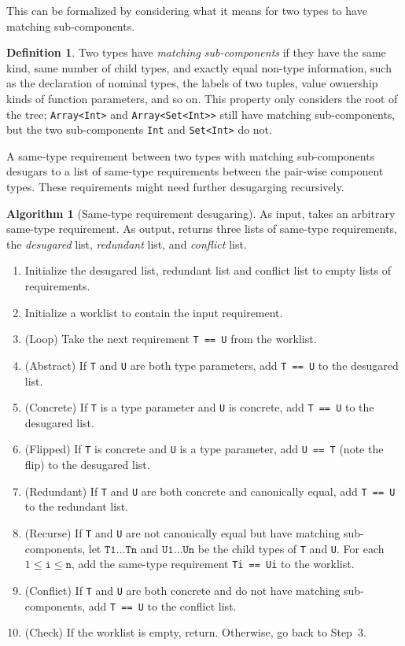 \documentclass[a4paper,headsepline,bibliography=totoc,toc=flat,fleqn,twoside=semi]{scrbook}
\theoremstyle{definition}
\newtheorem{definition}{Definition}[chapter]
\theoremstyle{definition}
\theoremstyle{definition}
\newtheorem{algorithm}{Algorithm}[chapter]
\begin{document}
This can be formalized by considering what it means for two types to have matching sub-components.
\begin{definition}
Two types have \emph{matching sub-components} if they have the same kind, same number of child types, and exactly equal non-type information, such as the declaration of nominal types, the labels of two tuples, value ownership kinds of function parameters, and so on. This property only considers the root of the tree; \texttt{Array<Int>} and \texttt{Array<Set<Int>>} still have matching sub-components, but the two sub-components \texttt{Int} and \texttt{Set<Int>} do not.
\end{definition}
A same-type requirement between two types with matching sub-components desugars to a list of same-type requirements between the pair-wise component types. These requirements might need further desugarging recursively.
\begin{algorithm}[Same-type requirement desugaring] As input, takes an arbitrary same-type requirement. As output, returns three lists of same-type requirements, the \emph{desugared} list, \emph{redundant} list, and \emph{conflict} list.
\begin{enumerate}
\item Initialize the desugared list, redundant list and conflict list to empty lists of requirements.
\item Initialize a worklist to contain the input requirement.
\item (Loop) Take the next requirement \texttt{T == U} from the worklist.
\item (Abstract) If \texttt{T} and \texttt{U} are both type parameters, add \texttt{T == U} to the desugared list.
\item (Concrete) If \texttt{T} is a type parameter and \texttt{U} is concrete, add \texttt{T == U} to the desugared list.
\item (Flipped) If \texttt{T} is concrete and \texttt{U} is a type parameter, add \texttt{U == T} (note the flip) to the desugared list.
\item (Redundant) If \texttt{T} and \texttt{U} are both concrete and canonically equal, add \texttt{T == U} to the redundant list.
\item (Recurse) If \texttt{T} and \texttt{U} are not canonically equal but have matching sub-components, let $\texttt{T1}\ldots\texttt{Tn}$ and $\texttt{U1}\ldots\texttt{Un}$ be the child types of \texttt{T} and \texttt{U}. For each $1\le \texttt{i}\le \texttt{n}$, add the same-type requirement \texttt{Ti == Ui} to the worklist.
\item (Conflict) If \texttt{T} and \texttt{U} are both concrete and do not have matching sub-components, add \texttt{T == U} to the conflict list.
\item (Check) If the worklist is empty, return. Otherwise, go back to Step~3.
\end{enumerate}
\end{algorithm}
\fi
\end{document}
